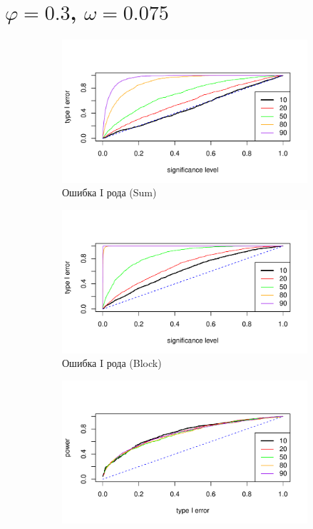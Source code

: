 \documentclass[specialist,
substylefile = spbu_report.rtx,
subf,href,colorlinks=true, 12pt]{disser}
\theoremstyle{definition}
\begin{document}
\section{$\varphi=0.3$, $\omega=0.075$}
\begin{figure}[h!]
	\captionsetup[subfigure]{justification=Centering}
	\begin{subfigure}[t]{0.5\textwidth}
		\centering
		\includegraphics[width=\textwidth]{img/type1error_sum_ev_phi3.pdf}
		\caption{Ошибка I рода (Sum)}
	\end{subfigure}\hspace{\fill}
	\begin{subfigure}[t]{0.5\textwidth}
		\centering
		\includegraphics[width=\textwidth]{img/type1error_block_ev_phi3.pdf}
		\caption{Ошибка I рода (Block)}
	\end{subfigure}
	\bigskip
	\begin{subfigure}[t]{0.5\textwidth}
		\centering
		\includegraphics[width=\textwidth]{img/roc_sum_ev_phi3_omega0075.pdf}

\end{subfigure}
\end{figure}
\end{document}
